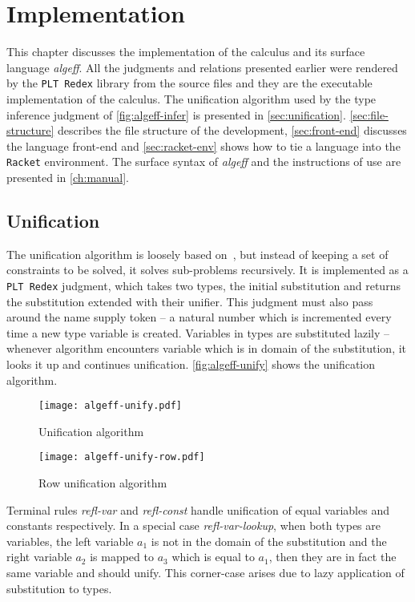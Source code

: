 \documentclass[inz, english, longabstract]{iithesis}
\newcommand{\Redex}{\texttt{PLT Redex}}
\newcommand{\Racket}{\texttt{Racket}}
\begin{document}
\chapter{Implementation}\label{ch:implementation}
This chapter discusses the implementation of the calculus and its surface language \emph{algeff}.
All the judgments and relations presented earlier were rendered by the \Redex{} library from the source files and they are the executable implementation of the calculus.
The unification algorithm used by the type inference judgment of \autoref{fig:algeff-infer} is presented in \autoref{sec:unification}.
\autoref{sec:file-structure} describes the file structure of the development, \autoref{sec:front-end} discusses the language front-end and \autoref{sec:racket-env} shows how to tie a language into the \Racket{} environment.
The surface syntax of \emph{algeff} and the instructions of use are presented in \autoref{ch:manual}.

\section{Unification}\label{sec:unification}
The unification algorithm is loosely based on~\cite{Pierce2002}, but instead of keeping a set of constraints to be solved, it solves sub-problems recursively.
It is implemented as a \Redex{} judgment, which takes two types, the initial substitution and returns the substitution extended with their unifier.
This judgment must also pass around the name supply token -- a natural number which is incremented every time a new type variable is created.
Variables in types are substituted lazily -- whenever algorithm encounters variable which is in domain of the substitution, it looks it up and continues unification.
\autoref{fig:algeff-unify} shows the unification algorithm.

\begin{figure}
  \centering
  \texttt{[image: algeff-unify.pdf]}
  \caption{Unification algorithm}
  \label{fig:algeff-unify}
\end{figure}

\begin{figure}
  \centering
  \texttt{[image: algeff-unify-row.pdf]}
  \caption{Row unification algorithm}
  \label{fig:algeff-unify-row}
\end{figure}

Terminal rules \emph{refl-var} and \emph{refl-const} handle unification of equal variables and constants respectively.
In a special case \emph{refl-var-lookup}, when both types are variables, the left variable $a_1$ is not in the domain of the substitution and the right variable $a_2$ is mapped to $a_3$ which is equal to $a_1$, then they are in fact the same variable and should unify.
This corner-case arises due to lazy application of substitution to types.
\end{document}
